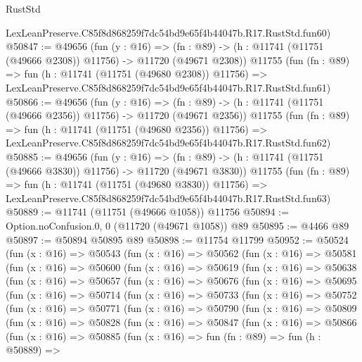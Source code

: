 \begin{lexlean}{RustStd}
\begin{coremodule}
    LexLeanPreserve.C85f8d868259f7dc54bd9e65f4b44047b.R17.RustStd.fun60)
@50847 := @49656
    (fun (y : @16) =>
    (fn : @89) -> (h : @11741 (@11751 (@49666 @2308)) @11756) -> @11720 (@49671 @2308))
    @11755
    (fun (fn : @89) =>
    fun (h : @11741 (@11751 (@49680 @2308)) @11756) =>
    LexLeanPreserve.C85f8d868259f7dc54bd9e65f4b44047b.R17.RustStd.fun61)
@50866 := @49656
    (fun (y : @16) =>
    (fn : @89) -> (h : @11741 (@11751 (@49666 @2356)) @11756) -> @11720 (@49671 @2356))
    @11755
    (fun (fn : @89) =>
    fun (h : @11741 (@11751 (@49680 @2356)) @11756) =>
    LexLeanPreserve.C85f8d868259f7dc54bd9e65f4b44047b.R17.RustStd.fun62)
@50885 := @49656
    (fun (y : @16) =>
    (fn : @89) -> (h : @11741 (@11751 (@49666 @3830)) @11756) -> @11720 (@49671 @3830))
    @11755
    (fun (fn : @89) =>
    fun (h : @11741 (@11751 (@49680 @3830)) @11756) =>
    LexLeanPreserve.C85f8d868259f7dc54bd9e65f4b44047b.R17.RustStd.fun63)
@50889 := @11741 (@11751 (@49666 @1058)) @11756
@50894 := Option.noConfusion.{0, 0} (@11720 (@49671 @1058)) @89
@50895 := @4466 @89
@50897 := @50894 @50895 @89
@50898 := @11754 @11799
@50952 := @50524
    (fun (x : @16) =>
    @50543
      (fun (x : @16) =>
      @50562
        (fun (x : @16) =>
        @50581
          (fun (x : @16) =>
          @50600
            (fun (x : @16) =>
            @50619
              (fun (x : @16) =>
              @50638
                (fun (x : @16) =>
                @50657
                  (fun (x : @16) =>
                  @50676
                    (fun (x : @16) =>
                    @50695
                      (fun (x : @16) =>
                      @50714
                        (fun (x : @16) =>
                        @50733
                          (fun (x : @16) =>
                          @50752
                            (fun (x : @16) =>
                            @50771
                              (fun (x : @16) =>
                              @50790
                                (fun (x : @16) =>
                                @50809
                                  (fun (x : @16) =>
                                  @50828
                                    (fun (x : @16) =>
                                    @50847
                                      (fun (x : @16) =>
                                      @50866
                                        (fun (x : @16) =>
                                        @50885
                                          (fun (x : @16) =>
                                          fun (fn : @89) =>
                                          fun (h : @50889) =>

\end{coremodule}
\end{lexlean}
